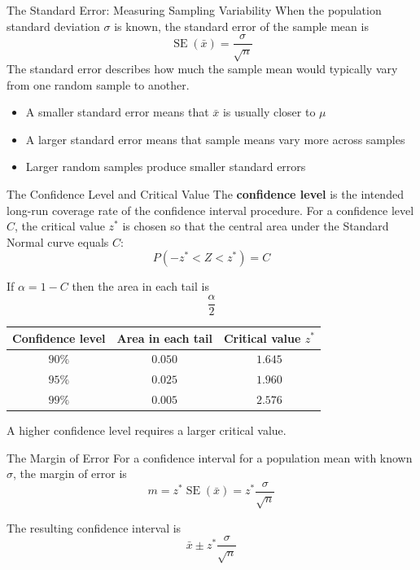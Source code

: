 \documentclass[aspectratio=169]{beamer}
\begin{document}
\begin{frame}{The Standard Error: Measuring Sampling Variability}
When the population standard deviation $\sigma$ is known, the standard error of the sample mean is
$$\operatorname{SE}(\bar{x})=\frac{\sigma}{\sqrt{n}}$$
The standard error describes how much the sample mean would typically vary from one random sample to another.
\begin{itemize}
  \item A smaller standard error means that $\bar{x}$ is usually closer to $\mu$
  \item A larger standard error means that sample means vary more across samples
  \item Larger random samples produce smaller standard errors
\end{itemize}
\end{frame}

\begin{frame}{The Confidence Level and Critical Value}
The \textbf{confidence level} is the intended long-run coverage rate of the confidence interval procedure. For a confidence level $C$, the critical value $z^*$ is chosen so that the central area under the Standard Normal curve equals $C$:
$$P(-z^*<Z<z^*)=C$$

If $\alpha=1-C$
then the area in each tail is
$$\frac{\alpha}{2}$$

\vspace{0.15cm}
\begin{center}
\begin{tabular}{ccc}
\toprule
\textbf{Confidence level} & \textbf{Area in each tail} & \textbf{Critical value $z^*$} \\
\midrule
$90\%$ & $0.050$ & $1.645$ \\
$95\%$ & $0.025$ & $1.960$ \\
$99\%$ & $0.005$ & $2.576$ \\
\bottomrule
\end{tabular}
\end{center}

A higher confidence level requires a larger critical value.
\end{frame}

\begin{frame}{The Margin of Error}
For a confidence interval for a population mean with known $\sigma$, the margin of error is
$$m=z^*\operatorname{SE}(\bar{x})=z^*\frac{\sigma}{\sqrt{n}}$$

The resulting confidence interval is
$$\boxed{\bar{x}\pm z^*\frac{\sigma}{\sqrt{n}}}$$
\end{frame}
\end{document}
